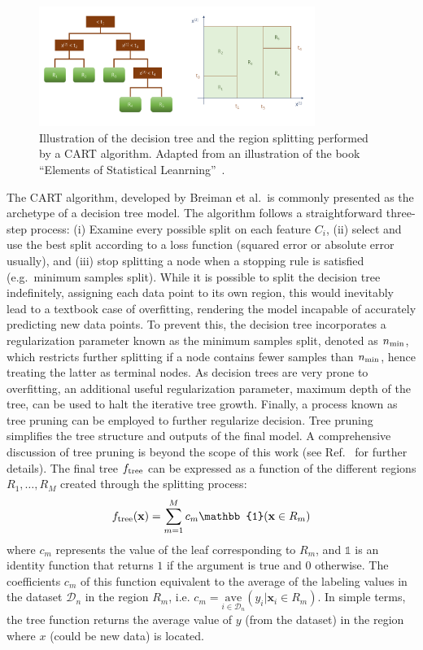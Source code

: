 \documentclass[main]{subfiles}
\begin{document}
\begin{figure}[ht]
  \centering
  \includegraphics[width=0.8\textwidth]{figures/4-ml/decision_tree.pdf}
  \caption{Illustration of the decision tree and the region splitting performed by a CART\autocite{Breiman_2017} algorithm. Adapted from an illustration of the book ``Elements of Statistical Leanrning''~\cite{Hastie_2009}.}\label{fgr:tree}
\end{figure}

The CART\autocite{Breiman_2017} algorithm, developed by Breiman et al.\, is commonly presented as the archetype of a decision tree model. The algorithm follows a straightforward three-step process: (i) Examine every possible split on each feature $C_i$, (ii) select and use the best split according to a loss function (squared error or absolute error usually), and (iii) stop splitting a node when a stopping rule is satisfied (e.g.\ minimum samples split).\autocite{Dension_1998} While it is possible to split the decision tree indefinitely, assigning each data point to its own region, this would inevitably lead to a textbook case of overfitting, rendering the model incapable of accurately predicting new data points. To prevent this, the decision tree incorporates a regularization parameter known as the minimum samples split, denoted as $n_{\text{min}}$, which restricts further splitting if a node contains fewer samples than $n_{\text{min}}$, hence treating the latter as terminal nodes. As decision trees are very prone to overfitting, an additional useful regularization parameter, maximum depth of the tree, can be used to halt the iterative tree growth. Finally, a process known as tree pruning can be employed to further regularize decision. Tree pruning simplifies the tree structure and outputs of the final model. A comprehensive discussion of tree pruning is beyond the scope of this work (see Ref.~\cite{Hastie_2009} for further details). The final tree $f_{\text{tree}}$ can be expressed as a function of the different regions $R_1,\ldots,R_M$ created through the splitting process:
\begin{equation}
  f\e{tree}(\mathbf{x}) = \sum_{m=1}^M c_m \mathbb{1}(\mathbf{x}\in R_m)
\end{equation}
where $c_m$ represents the value of the leaf corresponding to $R_m$, and $\mathbb{1}$ is an identity function that returns $1$ if the argument is true and $0$ otherwise. The coefficients $c_m$ of this function equivalent to the average of the labeling values in the dataset $\mathcal{D}_n$ in the region $R_m$, i.e. $c_m= \underset{i\in \mathcal{D}_n}{\text{ave}}(y_i|\mathbf{x}_i\in R_m)$.
In simple terms, the tree function returns the average value of $y$ (from the dataset) in the region where $x$ (could be new data) is located. 
\end{document}
